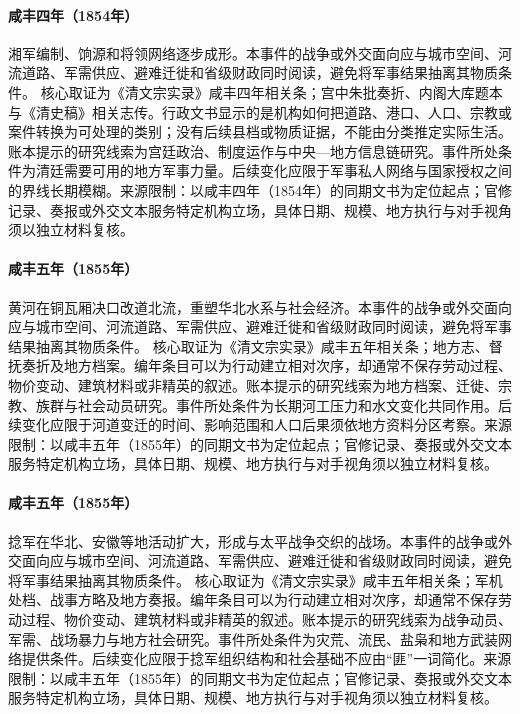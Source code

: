 \hypertarget{civic:EQ-1854-XIANG-ARMY-ORGANIZATION}{}\paragraph{咸丰四年（1854年）}湘军编制、饷源和将领网络逐步成形。本事件的战争或外交面向应与城市空间、河流道路、军需供应、避难迁徙和省级财政同时阅读，避免将军事结果抽离其物质条件。 核心取证为《清文宗实录》咸丰四年相关条；宫中朱批奏折、内阁大库题本与《清史稿》相关志传。行政文书显示的是机构如何把道路、港口、人口、宗教或案件转换为可处理的类别；没有后续县档或物质证据，不能由分类推定实际生活。账本提示的研究线索为宫廷政治、制度运作与中央—地方信息链研究。事件所处条件为清廷需要可用的地方军事力量。后续变化应限于军事私人网络与国家授权之间的界线长期模糊。来源限制：以咸丰四年（1854年）的同期文书为定位起点；官修记录、奏报或外交文本服务特定机构立场，具体日期、规模、地方执行与对手视角须以独立材料复核。
\hypertarget{civic:EQ-1855-YELLOW-RIVER-COURSE-SHIFT}{}\paragraph{咸丰五年（1855年）}黄河在铜瓦厢决口改道北流，重塑华北水系与社会经济。本事件的战争或外交面向应与城市空间、河流道路、军需供应、避难迁徙和省级财政同时阅读，避免将军事结果抽离其物质条件。 核心取证为《清文宗实录》咸丰五年相关条；地方志、督抚奏折及地方档案。编年条目可以为行动建立相对次序，却通常不保存劳动过程、物价变动、建筑材料或非精英的叙述。账本提示的研究线索为地方档案、迁徙、宗教、族群与社会动员研究。事件所处条件为长期河工压力和水文变化共同作用。后续变化应限于河道变迁的时间、影响范围和人口后果须依地方资料分区考察。来源限制：以咸丰五年（1855年）的同期文书为定位起点；官修记录、奏报或外交文本服务特定机构立场，具体日期、规模、地方执行与对手视角须以独立材料复核。
\hypertarget{civic:EQ-1855-NIAN-REBELLION-EXPANSION}{}\paragraph{咸丰五年（1855年）}捻军在华北、安徽等地活动扩大，形成与太平战争交织的战场。本事件的战争或外交面向应与城市空间、河流道路、军需供应、避难迁徙和省级财政同时阅读，避免将军事结果抽离其物质条件。 核心取证为《清文宗实录》咸丰五年相关条；军机处档、战事方略及地方奏报。编年条目可以为行动建立相对次序，却通常不保存劳动过程、物价变动、建筑材料或非精英的叙述。账本提示的研究线索为战争动员、军需、战场暴力与地方社会研究。事件所处条件为灾荒、流民、盐枭和地方武装网络提供条件。后续变化应限于捻军组织结构和社会基础不应由“匪”一词简化。来源限制：以咸丰五年（1855年）的同期文书为定位起点；官修记录、奏报或外交文本服务特定机构立场，具体日期、规模、地方执行与对手视角须以独立材料复核。

